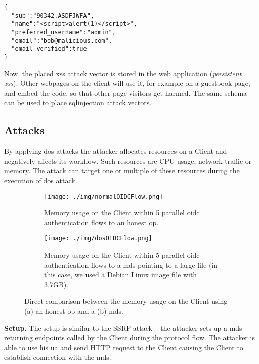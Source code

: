 \documentclass[conference,compsoc]{IEEEtran}
\renewcommand*{\paragraph}[1]{\vspace{2mm}\noindent\textbf{#1.}}
\begin{document}
\begin{lstlisting}[style=json,caption={An example of an \gls{xss} attack vector hidden in the "name" filed within an Access Token.},label={lst:xssAccessToken}]
{
  "sub":"90342.ASDFJWFA",
  "name":"<script>alert(1)</script>",
  "preferred_username":"admin",
  "email":"bob@malicious.com",
  "email_verified":true
}
\end{lstlisting}

Now, the placed \gls{xss} attack vector is stored in the web application (\emph{persistent \gls{xss}}).
Other webpages on the client will use it, for example on a guestbook page, and embed the code, so that other page visitors get harmed.
The same schema can be used to place \gls{sqlinjection} attack vectors.

\subsection{ Attacks}
\label{sec:dosattacks}
By applying \gls{dos} attacks the attacker allocates resources on a Client and negatively affects its workflow.  
Such resources are CPU usage, network traffic or memory.
The attack can target one or multiple of these resources during the execution of \gls{dos} attack.

\begin{figure}[!ht]
	\centering
	\begin{subfigure}[b]{0.5\textwidth}
		\centering
		\texttt{[image: ./img/normalOIDCFlow.png]}
\caption{Memory usage on the Client within 5 parallel \gls{oidc} authentication flows to an honest \gls{op}.}
		\label{fig:normalFlow}
	\end{subfigure}
	\begin{subfigure}[b]{0.5\textwidth}
		\centering
		\texttt{[image: ./img/dosOIDCFlow.png]}
\caption{Memory usage on the Client within 5 parallel \gls{oidc} authentication flows to a \gls{mds} pointing to a large file (in this case, we used a Debian Linux image file with 3.7GB).}
		\label{fig:dosFlow}
	\end{subfigure}
	
	\caption{Direct comparison between the memory usage on the Client using (a) an honest \gls{op} and a (b) \gls{mds}.}
	\label{fig:dosmeasurement}
\end{figure}

\paragraph{Setup}
The setup is similar to the SSRF attack -- the attacker sets up a \gls{mds} returning endpoints called by the Client during the protocol flow.
The attacker is able to use his \gls{ua} and send HTTP request to the Client causing the Client to establish connection with the \gls{mds}.
\end{document}
